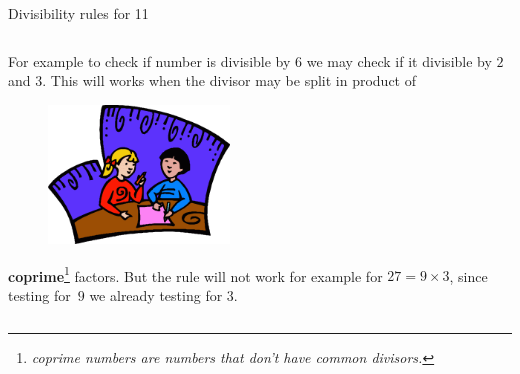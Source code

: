 \documentclass[9pt,aspectratio=169]{beamer}
\begin{document}
\begin{frame}{Divisibility rules for 11}
\begin{columns}[T]
\begin{column}{0.5\textwidth}
      For example to check if number is divisible by $6$ we may check if it divisible by $2$ and $3$. This will works when the divisor may be split in product of 
      \begin{figure}
        \vspace*{-0.8em}
        \includegraphics[width=0.43\textwidth]{01 - Modular arithmetic/collab.png}
      \end{figure}
      \textbf{coprime}\footnote{\emph{coprime numbers are numbers that don't have common divisors.}} factors. 
      But the rule will not work for example for $27 = 9 \times 3$, since testing for~$9$ we already testing for $3$.
      \vspace*{1.7em}
    \end{column}
  \end{columns}
\end{frame}
\end{document}
